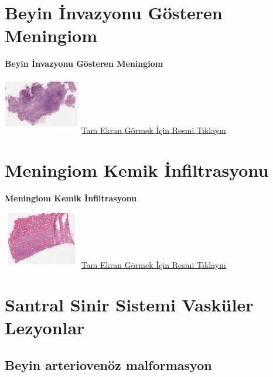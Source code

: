 \documentclass[
  letterpaper,
  DIV=11,
  numbers=noendperiod]{scrreprt}
\begin{document}
\hypertarget{sec-beyin-invazyonu-gosteren-meningiom}{%
\chapter{Beyin İnvazyonu Gösteren
Meningiom}\label{sec-beyin-invazyonu-gosteren-meningiom}}

\textbf{Beyin İnvazyonu Gösteren Meningiom}

\href{https://images.patolojiatlasi.com/brain-invasive-meningioma/HE.html}{\includegraphics[width=0.25\textwidth,height=\textheight]{./screenshots/thumbnail_brain-invasive-meningioma.png}}
\href{https://images.patolojiatlasi.com/brain-invasive-meningioma/HE.html}{Tam
Ekran Görmek İçin Resmi Tıklayın}

\hypertarget{sec-kemik-infiltrasyonu-gosteren-meningiom}{%
\chapter{Meningiom Kemik
İnfiltrasyonu}\label{sec-kemik-infiltrasyonu-gosteren-meningiom}}

\textbf{Meningiom Kemik İnfiltrasyonu}

\href{https://images.patolojiatlasi.com/meningioma-bone-infiltration/HE.html}{\includegraphics[width=0.25\textwidth,height=\textheight]{./screenshots/thumbnail_meningioma-bone-infiltration.png}}
\href{https://images.patolojiatlasi.com/meningioma-bone-infiltration/HE.html}{Tam
Ekran Görmek İçin Resmi Tıklayın}

\hypertarget{sec-santral-sinir-sistemi-vaskuler}{%
\chapter{Santral Sinir Sistemi Vasküler
Lezyonlar}\label{sec-santral-sinir-sistemi-vaskuler}}

\hypertarget{sec-beyin-arteriovenoz-malformasyon}{%
\section{Beyin arteriovenöz
malformasyon}\label{sec-beyin-arteriovenoz-malformasyon}}
\end{document}
